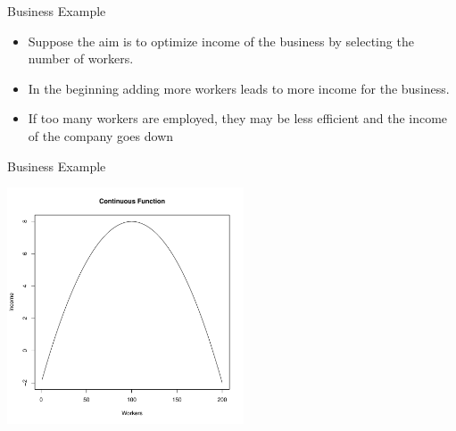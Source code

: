 \documentclass[10pt]{beamer}
\begin{document}
                                                                                              \begin{frame}{Business Example}
                                                                                                \begin{itemize}
                                                                                                \item Suppose the aim is to optimize income of the business by selecting the number of workers.

                                                                                                \item In the beginning adding more workers leads to more income for the business.

                                                                                                \item If too many workers are employed, they may be less efficient and the income of the company goes down
                                                                                                \end{itemize}
                                                                                              \end{frame}
                                                                                              \begin{frame}{Business Example}
                                                                                                \begin{center}
                                                                                                  \includegraphics[height=7cm]{RCode/contfunc.pdf}
                                                                                                \end{center}
                                                                                              \end{frame}
\end{document}
